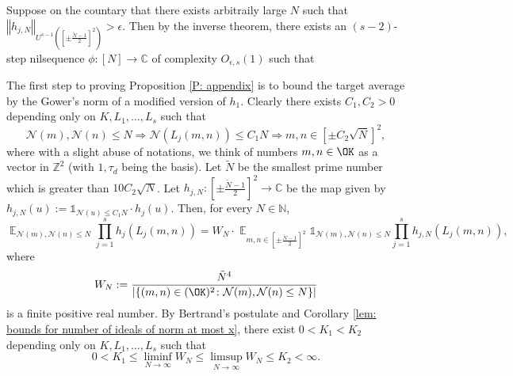 \documentclass[11pt]{amsart}
\theoremstyle{definition}
\DeclareMathOperator*{\E}{\mathbb{E}}
\newcommand{\C}{{\mathbb C}}
\newcommand{\N}{{\mathbb N}}
\newcommand{\NN}{{\mathcal N}}
\newcommand{\Z}{{\mathbb Z}}
\newcommand{\e}{\epsilon}
\newcommand{\norm}[1]{\left\Vert #1\right\Vert}
\begin{document}
Suppose on the countary that there exists arbitraily large $N$ such that 
$\norm{h_{j,N}}_{U^{s-1}([\pm\frac{\tilde{N}-1}{2}]^{2})}>\e$. Then by the inverse theorem, there exists an $(s-2)$-step nilsequence $\phi\colon [N]\to\C$ of complexity $O_{\e,s}(1)$ such that 

\fi



The first step to proving Proposition \ref{P: appendix} is to bound the target average by the Gower's norm of a modified version of $h_{1}$. 
Clearly there exists $C_{1},C_{2}>0$ depending only on $K,L_{1},\dots,L_{s}$ such that
$$\NN(m),\NN(n)\leq N\Rightarrow \NN(L_{j}(m,n)) \leq  C_{1}N\Rightarrow m,n\in[\pm C_{2}\sqrt{N}]^{2},$$
where with a slight abuse of notations, we think of numbers $m,n\in\OK$ as a vector in $\Z^{2}$ (with $1,\tau_{d}$ being the basis).
Let $\tilde{N}$ be the smallest prime number which is greater than $10C_{2}\sqrt{N}$.
Let $h_{j,N}\colon \left[\pm\frac{\tilde{N}-1}{2}\right]^{2}\to\C$ be the map given by $h_{j,N}(u):=\mathds{1}_{\NN(u)\leq C_{1}N}\cdot h_{j}(u)$.
Then, for every $N \in \N$, %
\begin{equation}\label{fwewgb}
    \E_{\NN(m),\NN(n) \leq  N} \prod_{j=1}^s h_j(L_j(m,n))=W_N\cdot \E_{m,n \in  \left[\pm\frac{\tilde{N}-1}{2}\right]^{2}} \mathds{1}_{\NN(m),\NN(n)\leq N}\prod_{j=1}^s h_{j,N}(L_j(m,n)),
\end{equation}
where 
$$W_N:=\frac{\tilde{N}^{4}}{\vert\{(m,n)\in(\OK)^{2}\colon \NN(m),\NN(n) \leq  N\}\vert}$$
is a finite positive real number. %
%
%
By Bertrand's postulate and Corollary \ref{lem: bounds for number of ideals of norm at most x},
  there exist  $0<K_1<K_2$ depending only on $K,L_{1},\dots,L_{s}$ such that
 \begin{equation}\label{k1k2}
    0<K_1 \leq \liminf_{N \to \infty} W_N \leq \limsup_{N \to \infty } W_N \leq K_2 <\infty.
    \end{equation}
\end{document}
